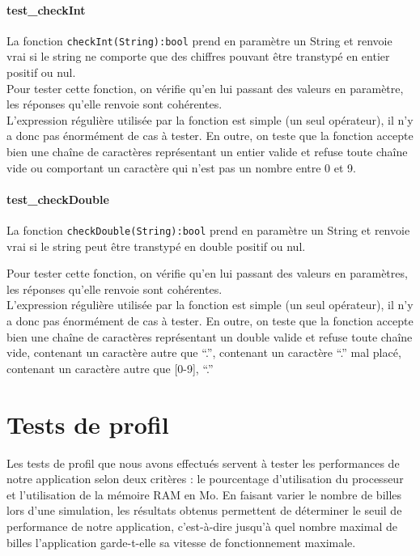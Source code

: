 \documentclass{report}
\begin{document}
\paragraph{test\_checkInt}

La fonction \texttt{checkInt(String):bool} prend en paramètre un String et renvoie vrai si le string ne comporte que des chiffres pouvant être transtypé en entier positif ou nul. \\

Pour tester cette fonction, on vérifie qu’en lui passant des valeurs en paramètre, les réponses qu’elle renvoie sont cohérentes. \\

L’expression régulière utilisée par la fonction est simple (un seul opérateur), il n’y a donc pas énormément de cas à tester. En outre, on teste que la fonction accepte bien une chaîne de caractères représentant un entier valide et refuse toute chaîne vide ou  comportant un caractère qui n’est pas un nombre entre 0 et 9.

\paragraph{test\_checkDouble}

La fonction \texttt{checkDouble(String):bool} prend en paramètre un String et renvoie vrai si le string peut être transtypé en double positif ou nul.

Pour tester cette fonction, on vérifie qu’en lui passant des valeurs en paramètres, les réponses qu’elle renvoie sont cohérentes. \\ 

L’expression régulière utilisée par la fonction est simple (un seul opérateur), il n’y a donc pas énormément de cas à tester. En outre, on teste que la fonction accepte bien une chaîne de caractères représentant un double valide et refuse toute chaîne vide, contenant un caractère autre que “.”, contenant un caractère “.” mal placé, contenant un caractère autre que {[0-9], “.”}

\newpage
\section{Tests de profil}

Les tests de profil que nous avons effectués servent à tester les performances de notre application selon deux critères : le pourcentage d’utilisation du processeur et l’utilisation de la mémoire RAM en Mo. En faisant varier le nombre de billes lors d’une simulation, les résultats obtenus permettent de déterminer le seuil de performance de notre application, c’est-à-dire jusqu’à quel nombre maximal de billes l’application garde-t-elle sa vitesse de fonctionnement maximale. \\
\end{document}
